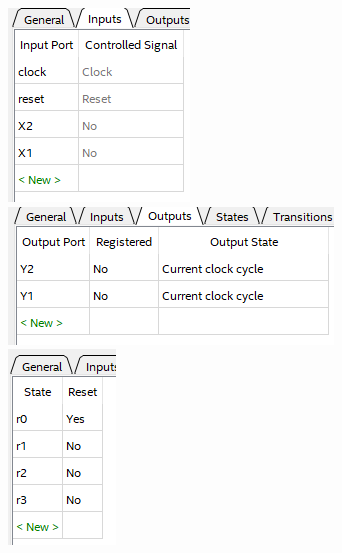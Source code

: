 \documentclass[a4paper,12pt]{article}
\begin{document}
    \begin{figure}[H]
        \centering
        \includegraphics[width=0.25\linewidth]{polytech/scheme/report-lab4/subfiles/images/smw1}
        \includegraphics[width=0.4\linewidth]{polytech/scheme/report-lab4/subfiles/images/smw2}
        \includegraphics[width=0.15\linewidth]{polytech/scheme/report-lab4/subfiles/images/smw3}


\end{figure}
\end{document}
